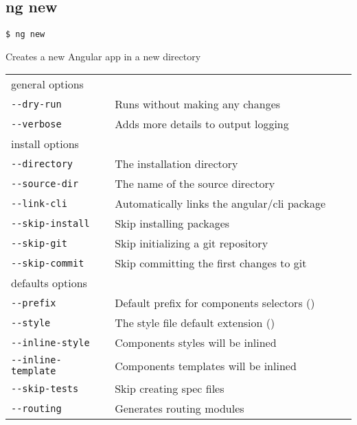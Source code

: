 \documentclass[8pt]{extarticle} %
\begin{document}
\begin{multicols}{3}
\section*{ng new}

  \vspace{1ex}
  {\tt \$ ng new \itt{[options...]} }

  \vspace{0.6ex}

  {\small Creates a new Angular app in a new directory}

  \vspace{0.6ex}

  \begin{tabular}{L{0.30\linewidth} L{0.70\linewidth}}
    \small{general options} & \\
    \tt -{}-dry-run & \small Runs without making any changes \\
    \tt -{}-verbose  & \small Adds more details to output logging \\
    \small{install options} & \\
    \tt -{}-directory  & \small The installation directory \\
    \tt -{}-source-dir  & \small The name of the source directory \\
    \tt -{}-link-cli & \small Automatically links the angular/cli package \\
    \tt -{}-skip-install & \small Skip installing packages \\
    \tt -{}-skip-git & \small Skip initializing a git repository \\
    \tt -{}-skip-commit & \small Skip committing the first changes to git \\
    \small{defaults options} & \\
    \tt -{}-prefix  & \small Default prefix for components selectors () \\
    \tt -{}-style  & \small The style file default extension () \\
    \tt -{}-inline-style & \small Components styles will be inlined \\
    \tt -{}-inline-template & \small Components templates will be inlined \\
    \tt -{}-skip-tests & \small Skip creating spec files \\
    \tt -{}-routing & \small Generates routing modules \\
  \end{tabular}


\end{multicols}
\end{document}

